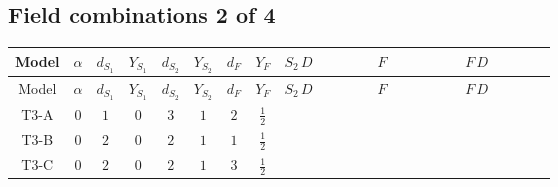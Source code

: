 \documentclass[8pt]{article}
\begin{document}
\begin{landscape}
\subsection*{Field combinations 2 of 4}
\begin{longtable}{@{}cccccccc >{\raggedright\arraybackslash}p{0.21\linewidth} >{\raggedright\arraybackslash}p{0.21\linewidth} >{\raggedright\arraybackslash}p{0.21\linewidth}@{}}
\toprule
Model & $\alpha$ & $d_{S_1}$ & $Y_{S_1}$ & $d_{S_2}$ & $Y_{S_2}$ & $d_F$ & $Y_F$ & $S_2\,D$ & $F$ & $F\,D$ \\
\midrule
\endfirsthead
\toprule
Model & $\alpha$ & $d_{S_1}$ & $Y_{S_1}$ & $d_{S_2}$ & $Y_{S_2}$ & $d_F$ & $Y_F$ & $S_2\,D$ & $F$ & $F\,D$ \\
\midrule
\endhead
T3-A & $0$ & $1$ & $0$ & $3$ & $1$ & $2$ & $\frac{1}{2}$ & \scriptsize\adjustbox{max width=\linewidth}{$\begin{gathered} +D_{\mu _1}\left(S_{2,j_1}\right){}^{\dagger } D_{\mu _1}\left(S_{2,j_1}\right)\end{gathered}$} & \scriptsize\adjustbox{max width=\linewidth}{$\begin{gathered} -\overline{F_{j_1,r_1}}\, F_{j_1,r_1} M_F\end{gathered}$} & \scriptsize\adjustbox{max width=\linewidth}{$\begin{gathered} +i \overline{F_{j_1,r_1}}\, \gamma ^{\mu _1}\, D_{\mu _1}\left(F_{j_1,r_1}\right)\end{gathered}$} \\
\midrule
T3-B & $0$ & $2$ & $0$ & $2$ & $1$ & $1$ & $\frac{1}{2}$ & \scriptsize\adjustbox{max width=\linewidth}{$\begin{gathered} +D_{\mu _1}\left(S_{2,j_1}\right){}^{\dagger } D_{\mu _1}\left(S_{2,j_1}\right)\end{gathered}$} & \scriptsize\adjustbox{max width=\linewidth}{$\begin{gathered} -\overline{F_{r_1}}\, F_{r_1} M_F\end{gathered}$} & \scriptsize\adjustbox{max width=\linewidth}{$\begin{gathered} +i \overline{F_{r_1}}\, \gamma ^{\mu _1}\, D_{\mu _1}\left(F_{r_1}\right)\end{gathered}$} \\
\midrule
T3-C & $0$ & $2$ & $0$ & $2$ & $1$ & $3$ & $\frac{1}{2}$ & \scriptsize\adjustbox{max width=\linewidth}{$\begin{gathered} +D_{\mu _1}\left(S_{2,j_1}\right){}^{\dagger } D_{\mu _1}\left(S_{2,j_1}\right)\end{gathered}$} & \scriptsize\adjustbox{max width=\linewidth}{$\begin{gathered} -\overline{F_{j_1,r_1}}\, F_{j_1,r_1} M_F\end{gathered}$} & \scriptsize\adjustbox{max width=\linewidth}{$\begin{gathered} +i \overline{F_{j_1,r_1}}\, \gamma ^{\mu _1}\, D_{\mu _1}\left(F_{j_1,r_1}\right)\end{gathered}$} \\

\end{longtable}
\end{landscape}
\end{document}
